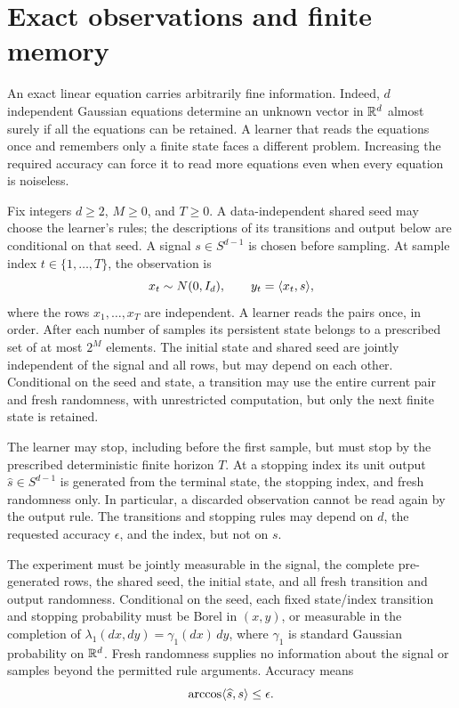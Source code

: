\section{Exact observations and finite memory}\label{h:introduction}

An exact linear equation carries arbitrarily fine information. Indeed,
\(d\) independent Gaussian equations determine an unknown vector in
\(\mathbb R^d\) almost surely if all the equations can be retained. A learner
that reads the equations once and remembers only a finite state faces
a different problem. Increasing the required accuracy can force it to
read more equations even when every equation is noiseless.

\begin{definition}\label{h:model}
Fix integers \(d\ge2\), \(M\ge0\), and \(T\ge0\). A data-independent
shared seed may choose the learner's rules; the descriptions of its
transitions and output below are conditional on that seed. A signal
\(s\in S^{d-1}\) is chosen before sampling. At sample index
\(t\in\{1,\ldots,T\}\), the observation is
\[
 x_t\sim N(0,I_d),\qquad y_t=\langle x_t,s\rangle,
\]
where the rows \(x_1,\ldots,x_T\) are independent. A learner reads the
pairs once, in order. After each number of samples its persistent state
belongs to a prescribed set of at most \(2^M\) elements. The initial
state and shared seed are jointly independent of the signal and all
rows, but may depend on each other. Conditional on the seed and state,
a transition may use the entire current pair and fresh
randomness, with unrestricted computation, but only the next finite
state is retained.

The learner may stop, including before the first sample, but must stop
by the prescribed deterministic finite horizon \(T\). At a stopping index its unit
output \(\widehat s\in S^{d-1}\) is generated from the terminal state,
the stopping index, and fresh randomness only. In particular, a
discarded observation cannot be read again by the output rule.
The transitions and stopping rules may depend on \(d\), the requested
accuracy \(\epsilon\), and the index, but not on \(s\).

The experiment must be jointly measurable in the signal, the complete
pre-generated rows, the shared seed, the initial state, and all fresh
transition and output randomness. Conditional on the seed, each fixed
state/index transition and stopping probability must be Borel in
\((x,y)\), or measurable in the completion of
\(\lambda_1(dx,dy)=\gamma_1(dx)\,dy\), where \(\gamma_1\) is standard
Gaussian probability on \(\mathbb R^d\). Fresh randomness supplies no
information about the signal or samples beyond the permitted rule
arguments. Accuracy means
\[
 \arccos\langle \widehat s,s\rangle\le\epsilon.
\]
\end{definition}

